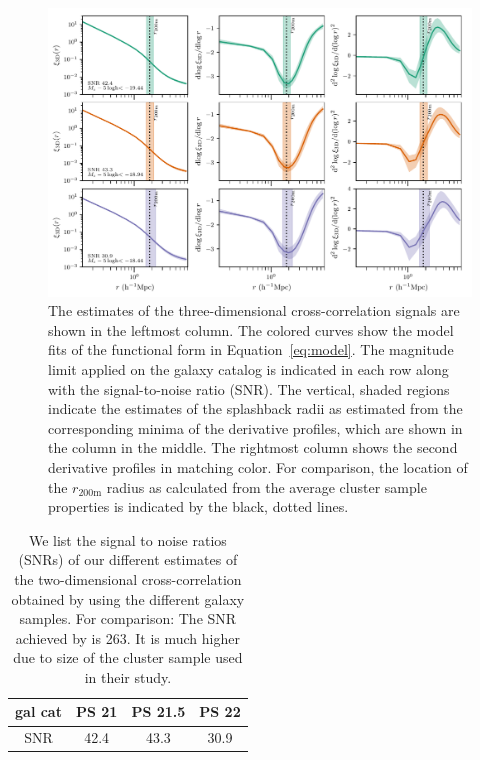 \documentclass[iop, apjl, twocolappendix, numberedappendix]{emulateapj}
\begin{document}
\begin{figure}
    \centering
    \includegraphics[scale=0.85]{3D_graphs_with_spline_no_mc.pdf}
\caption{The estimates of the three-dimensional cross-correlation
signals are shown in the leftmost column. The colored curves show the
model fits of the functional form in Equation~\ref{eq:model}. The magnitude
limit applied on the galaxy catalog is indicated in each row along with 
the signal-to-noise ratio (SNR). The vertical, shaded regions indicate the 
estimates of the splashback radii as estimated from the corresponding minima 
of the derivative profiles, which are shown in the column in the middle. The
rightmost column shows the second derivative profiles in matching color.
For comparison, the location of the $r_{\mathrm{200m}}$ radius as calculated 
from the average cluster sample properties is indicated by the black, dotted
lines.}
   \label{fig:3D_graphs} 
\end{figure}


\begin{table}
    \centering
    \caption{We list the signal to noise ratios (SNRs) of our
different estimates of the two-dimensional cross-correlation
obtained by using the different galaxy samples. For comparison: The SNR
achieved by \citet{more2016detection} is 263. It is much higher
due to size of the cluster sample used in their study.}
    \label{tab:snr}
    \begin{tabular}{cccc}
    \hline
    gal cat & PS 21 & PS 21.5 & PS 22 \\ 
    \hline
    \hline
   SNR & 42.4 & 43.3 & 30.9 \\
    \hline
    \end{tabular} 
\end{table}
\end{document}
